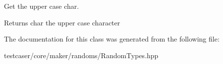 Get the upper case char. 

\begin{DoxyReturn}{Returns}
char the upper case character 
\end{DoxyReturn}


The documentation for this class was generated from the following file\+:\begin{DoxyCompactItemize}
\item 
testcaser/core/maker/randoms/Random\+Types.\+hpp\end{DoxyCompactItemize}
